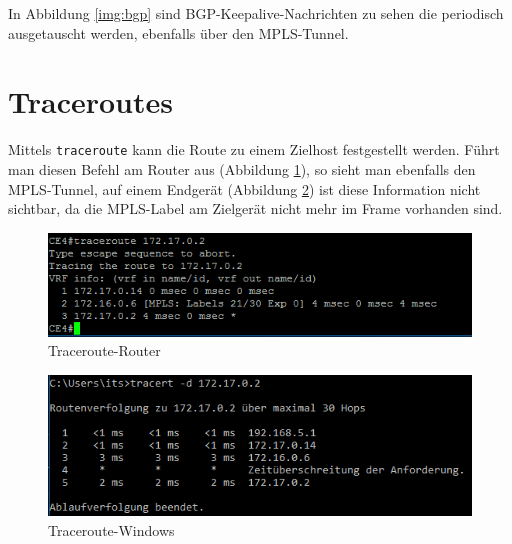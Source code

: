 In Abbildung \ref{img:bgp} sind \ac{BGP}-Keepalive-Nachrichten zu sehen die periodisch ausgetauscht werden, ebenfalls über den \ac{MPLS}-Tunnel.

\section{Traceroutes}

Mittels \texttt{traceroute} kann die Route zu einem Zielhost festgestellt werden. Führt man diesen Befehl am Router aus (Abbildung \ref{img:trace_router}), so sieht man ebenfalls den \ac{MPLS}-Tunnel, auf einem Endgerät (Abbildung \ref{img:trace_win}) ist diese Information nicht sichtbar, da die MPLS-Label am Zielgerät nicht mehr im Frame vorhanden sind.

\begin{figure}[H]
	\centering
	\includegraphics[width=1.0\textwidth]{data/traceroute_router.PNG}
	\caption{Traceroute-Router}
	\label{img:trace_router}
\end{figure}

\begin{figure}[H]
	\centering
	\includegraphics[width=1.0\textwidth]{data/traceroute_windows2.PNG}
	\caption{Traceroute-Windows}
	\label{img:trace_win}
\end{figure}